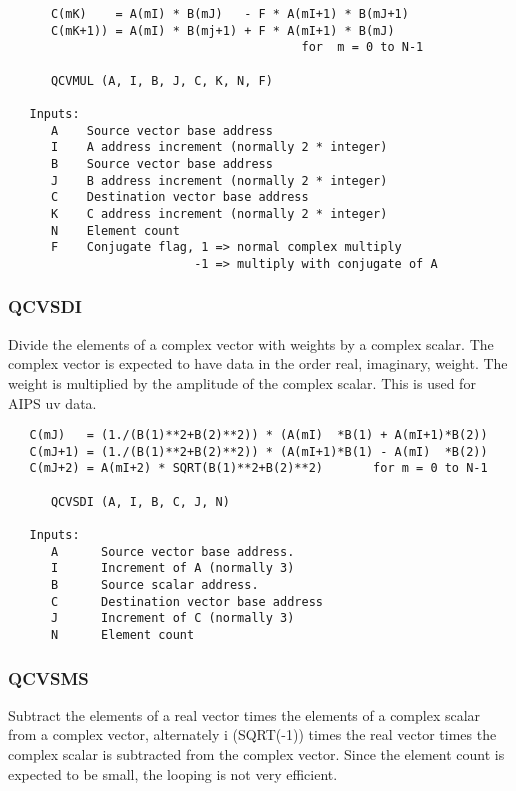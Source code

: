 \begin{verbatim}
      C(mK)    = A(mI) * B(mJ)   - F * A(mI+1) * B(mJ+1)
      C(mK+1)) = A(mI) * B(mj+1) + F * A(mI+1) * B(mJ)
                                         for  m = 0 to N-1

      QCVMUL (A, I, B, J, C, K, N, F)

   Inputs:
      A    Source vector base address
      I    A address increment (normally 2 * integer)
      B    Source vector base address
      J    B address increment (normally 2 * integer)
      C    Destination vector base address
      K    C address increment (normally 2 * integer)
      N    Element count
      F    Conjugate flag, 1 => normal complex multiply
                          -1 => multiply with conjugate of A

\end{verbatim}
\subsubsection{QCVSDI }
Divide the elements of a complex vector with weights by a complex
scalar. The complex vector is expected to have data in the order real,
imaginary, weight.  The weight is multiplied by the amplitude of the
complex scalar.  This is used for AIPS uv data.

\begin{verbatim}
   C(mJ)   = (1./(B(1)**2+B(2)**2)) * (A(mI)  *B(1) + A(mI+1)*B(2))
   C(mJ+1) = (1./(B(1)**2+B(2)**2)) * (A(mI+1)*B(1) - A(mI)  *B(2))
   C(mJ+2) = A(mI+2) * SQRT(B(1)**2+B(2)**2)       for m = 0 to N-1

      QCVSDI (A, I, B, C, J, N)

   Inputs:
      A      Source vector base address.
      I      Increment of A (normally 3)
      B      Source scalar address.
      C      Destination vector base address
      J      Increment of C (normally 3)
      N      Element count

\end{verbatim}
\subsubsection{QCVSMS }
Subtract the elements of a real vector times the elements of a complex
scalar from a complex vector, alternately i (SQRT(-1)) times the real
vector times the complex scalar is subtracted from the complex vector.
Since the element count is expected to be small, the looping is not
very efficient.

